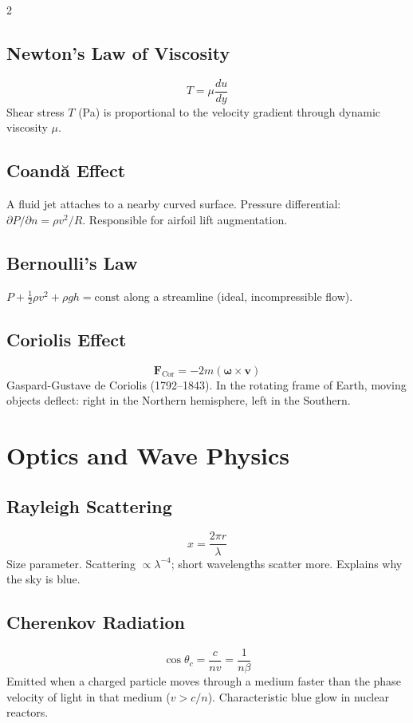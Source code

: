 \documentclass[10pt,a4paper]{article}
\begin{document}
\begin{multicols}{2}
\subsection{Newton's Law of Viscosity}
\[
T = \mu\frac{du}{dy}
\]
Shear stress $T$ (Pa) is proportional to the velocity gradient through dynamic viscosity $\mu$.

\subsection{Coand\u{a} Effect}
A fluid jet attaches to a nearby curved surface. Pressure differential: $\partial P/\partial n = \rho v^2/R$. Responsible for airfoil lift augmentation.

\subsection{Bernoulli's Law}
$P + \frac{1}{2}\rho v^2 + \rho gh = \text{const}$ along a streamline (ideal, incompressible flow).

\subsection{Coriolis Effect}
\[
\mathbf{F}_\text{Cor} = -2m(\boldsymbol{\omega}\times\mathbf{v})
\]
Gaspard-Gustave de Coriolis (1792--1843). In the rotating frame of Earth, moving objects deflect: right in the Northern hemisphere, left in the Southern.

\section{Optics and Wave Physics}

\subsection{Rayleigh Scattering}
\[
x = \frac{2\pi r}{\lambda}
\]
Size parameter. Scattering $\propto \lambda^{-4}$; short wavelengths scatter more. Explains why the sky is blue.

\subsection{Cherenkov Radiation}
\[
\cos\theta_c = \frac{c}{nv} = \frac{1}{n\beta}
\]
Emitted when a charged particle moves through a medium faster than the phase velocity of light in that medium ($v > c/n$). Characteristic blue glow in nuclear reactors.


\end{multicols}
\end{document}
